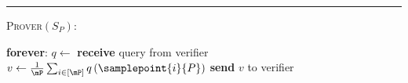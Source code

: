 \begin{protocol}[H]
\begin{ShadedAlgorithmBox}
		
		\noindent\rule{\textwidth}{0.5pt}
		
		\vspace*{0.5em}
		
		\textsc{Prover}$(S_P)$:
		\begin{algorithmic}
			\vspace*{0.2em}
			\Loop \textbf{ forever}:
			\vspace*{0.2em}
			\State $q \gets$ \textbf{receive} query from verifier
			\vspace*{0.5em}
			\State $v \gets \frac{1}{\mP}\sum_{i \in [\mP]}q\left(\samplepoint{i}{P}\right)$
			\vspace*{0.5em}
			\State \textbf{send} $v$ to verifier
			\EndLoop 
		\end{algorithmic}
		
	\end{ShadedAlgorithmBox}
	
	\caption{A PAC verification protocol for statistical query algorithms.}
	\label{protocol:sq-verification}
\end{protocol}


